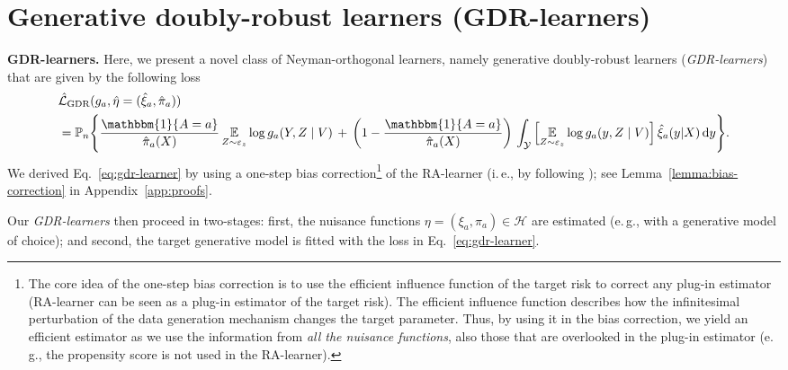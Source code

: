 \documentclass[dvipsnames]{article} %
\newcommand\ie{i.\,e.\xspace}
\newcommand\eg{e.\,g.\xspace}
\newcommand*\diff{\mathop{}\!\mathrm{d}}
\newcommand{\GDRlearners}{\emph{GDR-learners}\xspace}
\begin{document}
\section{Generative doubly-robust learners (GDR-learners)} \label{sec:gdr-learners}

\textbf{GDR-learners.} Here, we present a novel class of Neyman-orthogonal learners, namely generative doubly-robust learners (\GDRlearners) that are given by the following loss   
\begingroup\makeatletter\def\f@size{9}\check@mathfonts
\begin{align} \label{eq:gdr-learner}
        & \hat{\mathcal{L}}_\text{GDR}(g_a, \hat{\eta} = (\hat{\xi}_a, \hat{\pi}_a)) \\ & = \mathbb{P}_n\Bigg\{\frac{\mathbbm{1}\{A = a\}}{\hat{\pi}_a(X)} \, \underset{Z \sim \varepsilon_z }{\mathbb{E}} \log g_a(Y, Z \mid V) \,  + \, \left(1 - \frac{\mathbbm{1}\{A = a\}}{\hat{\pi}_a(X)} \right)\, \int_\mathcal{Y} \Big[\underset{Z \sim \varepsilon_z }{\mathbb{E}} \log g_a(y, Z \mid V) \Big] \, \hat{\xi}_a(y | X) \diff{y} \Bigg\}. \nonumber
\end{align}
\endgroup
We derived Eq.~\eqref{eq:gdr-learner} by using a one-step bias correction\footnote{{The core idea of the one-step bias correction is to use the efficient influence function of the target risk to correct any plug-in estimator (RA-learner can be seen as a plug-in estimator of the target risk). The efficient influence function describes how the infinitesimal perturbation of the data generation mechanism changes the target parameter. Thus, by using it in the bias correction, we yield an efficient estimator as we use the information from \emph{all the nuisance functions}, also those that are overlooked in the plug-in estimator (\eg, the propensity score is not used in the RA-learner).}} of the RA-learner (\ie, by following \citep{kennedy2024semiparametric, kennedy2023semiparametric,melnychuk2023normalizing}); see Lemma~\ref{lemma:bias-correction} in Appendix~\ref{app:proofs}. 

Our \GDRlearners then proceed in two-stages: first, the nuisance functions $\eta = ({\xi}_a, {\pi}_a) \in \mathcal{H}$ are estimated (\eg, with a generative model of choice); and second, the target generative model is fitted with the loss in Eq.~\eqref{eq:gdr-learner}.  
\end{document}
